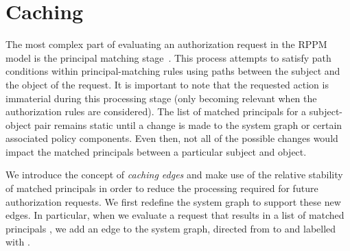 \documentclass{article}
\begin{document}
\begin{comment}
If only one condition is specified within the rule then the path-matching algorithm is only called once for that condition.
In the case of the positive principal-matching condition, a returned value of true indicates the condition was satisfied and therefore the principal of the rule is matched; a value of false indicates the condition was not satisfied and the principal does not match.
In contrast, in the case of the negative principal-matching condition being the sole condition within a rule, a value of true indicates the condition was satisfied and hence the principal does not match.
A returned value of false indicates the condition was not satisfied and, in this case, the principal is matched.

When a principal-matching rule contains both a positive and negative principal-matching condition the path-matching algorithm is first called with the positive condition.
In the case of a returned value of true the algorithm is called again but this time with the negative principal-matching condition.
If the second call returns true, then the principal does not match (as both conditions were satisfied); if it returns false, the principal is matched.
If on the other hand, the first call to the algorithm returns false, there is no need to call the algorithm again and the principal does not match.
\end{comment}

\section{Caching}\label{sec:caching}
The most complex part of evaluating an authorization request in the RPPM model is the principal matching stage~\cite[\S{3}]{CramptonS14}.
This process attempts to satisfy path conditions within principal-matching rules using paths between the subject and the object of the request.
It is important to note that the requested action is immaterial during this processing stage (only becoming relevant when the authorization rules are considered).
The list of matched principals for a subject-object pair remains static until a change is made to the system graph or certain associated policy components.
Even then, not all of the possible changes would impact the matched principals between a particular subject and object.

We introduce the concept of \emph{caching edges} and make use of the relative stability of matched principals in order to reduce the processing required for future authorization requests.
We first redefine the system graph to support these new edges.
In particular, when we evaluate a request  that results in a list of matched principals , we add an edge  to the system graph, directed from  to  and labelled with .
\end{document}

